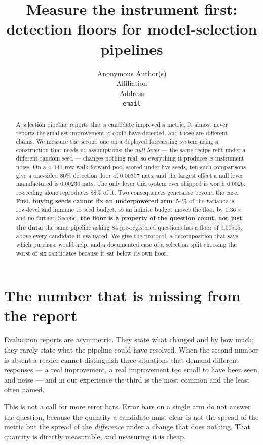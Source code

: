 \documentclass{article}
\title{Measure the instrument first:\\detection floors for model-selection pipelines}
\author{Anonymous Author(s)\\Affiliation\\Address\\\texttt{email}}
\begin{document}
\maketitle

\begin{abstract}
A selection pipeline reports that a candidate improved a metric. It almost never reports the smallest improvement it could have detected, and those are different claims. We measure the second one on a deployed forecasting system using a construction that needs no assumptions: the \emph{null lever} --- the same recipe refit under a different random seed --- changes nothing real, so everything it produces is instrument noise. On a $4{,}141$-row walk-forward pool scored under five seeds, ten such comparisons give a one-sided $80\%$ detection floor of $0.00307$ nats, and the largest effect a null lever manufactured is $0.00230$ nats. The only lever this system ever shipped is worth $0.0026$: re-seeding alone reproduces $88\%$ of it. Two consequences generalise beyond the case. First, \textbf{buying seeds cannot fix an underpowered arm}: $54\%$ of the variance is row-level and immune to seed budget, so an infinite budget moves the floor by $1.36\times$ and no further. Second, \textbf{the floor is a property of the question count, not just the data}: the same pipeline asking $84$ pre-registered questions has a floor of $0.00505$, above every candidate it evaluated. We give the protocol, a decomposition that says which purchase would help, and a documented case of a selection split choosing the worst of six candidates because it sat below its own floor.
\end{abstract}

\section{The number that is missing from the report}

Evaluation reports are asymmetric. They state what changed and by how much; they rarely state what the pipeline could have resolved. When the second number is absent a reader cannot distinguish three situations that demand different responses --- a real improvement, a real improvement too small to have been seen, and noise --- and in our experience the third is the most common and the least often named.

This is not a call for more error bars. Error bars on a single arm do not answer the question, because the quantity a candidate must clear is not the spread of the metric but the spread of the \emph{difference} under a change that does nothing. That quantity is directly measurable, and measuring it is cheap.
\end{document}
